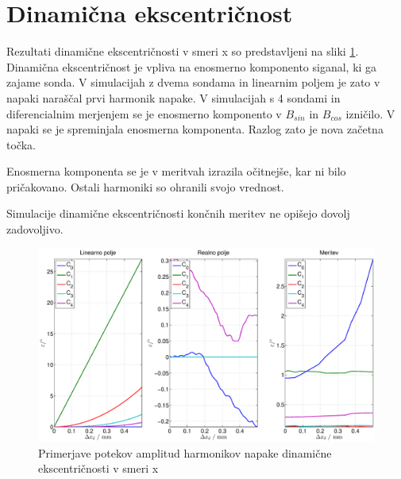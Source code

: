 \section{Dinamična ekscentričnost}
Rezultati dinamične ekscentričnosti v smeri x so predstavljeni na sliki \ref{primerjava_xd}. Dinamična ekscentričnost je vpliva na enosmerno komponento siganal, ki ga zajame sonda. V simulacijah z dvema sondama in linearnim poljem je zato v napaki naraščal prvi harmonik napake. V simulacijah s 4 sondami in diferencialnim merjenjem  se je enosmerno komponento v $B_{sin}$ in $B_{cos}$ izničilo. V napaki se je spreminjala  enosmerna komponenta. Razlog zato je nova začetna točka.

Enosmerna komponenta se je v meritvah izrazila očitnejše, kar ni bilo pričakovano. Ostali harmoniki so ohranili svojo vrednost.

Simulacije dinamične ekscentričnosti končnih meritev ne opišejo dovolj zadovoljivo.
\begin{figure}[ht]
	\centering
	\includegraphics[width=\columnwidth]{./Slike/primerjava_xd.eps}
	\caption{Primerjave potekov amplitud harmonikov napake  dinamične ekscentričnosti v smeri x}
	\label{primerjava_xd}
\end{figure}
